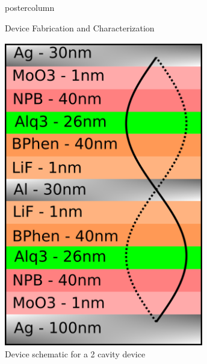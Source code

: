 \documentclass[final]{beamer}
\begin{document}
\begin{frame}
\begin{columns}
\begin{column}{.49\textwidth}
\begin{beamercolorbox}[center,wd=\textwidth]{postercolumn}
\begin{minipage}[T]{.99\textwidth}
{\begin{block}{Device Fabrication and Characterization}
\begin{minipage}{0.45\textwidth}
\begin{itemize}
					\end{itemize}
                \end{minipage}
                \begin{minipage}{0.45\textwidth}
                    \centering
                    \includegraphics[width=0.65\textwidth]{images/schematic.png}\\
                    \small Device schematic for a 2 cavity device
                \end{minipage}


\end{block}}
\end{minipage}
\end{beamercolorbox}
\end{column}
\end{columns}
\end{frame}
\end{document}

